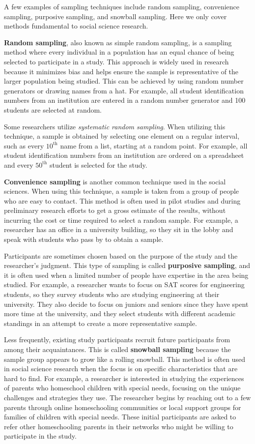 \documentclass[
  letterpaper,
  DIV=11,
  numbers=noendperiod]{scrreprt}
\begin{document}
A few examples of sampling techniques include random sampling,
convenience sampling, purposive sampling, and snowball sampling. Here we
only cover methods fundamental to social science research.

\textbf{Random sampling}, also known as simple random sampling, is a
sampling method where every individual in a population has an equal
chance of being selected to participate in a study. This approach is
widely used in research because it minimizes bias and helps ensure the
sample is representative of the larger population being studied. This
can be achieved by using random number generators or drawing names from
a hat. For example, all student identification numbers from an
institution are entered in a random number generator and 100 students
are selected at random.

Some researchers utilize \emph{systematic random sampling}. When
utilizing this technique, a sample is obtained by selecting one element
on a regular interval, such as every \(10^{\text{th}}\) name from a
list, starting at a random point. For example, all student
identification numbers from an institution are ordered on a spreadsheet
and every \(50^{\text{th}}\) student is selected for the study.

\textbf{Convenience sampling} is another common technique used in the
social sciences. When using this technique, a sample is taken from a
group of people who are easy to contact. This method is often used in
pilot studies and during preliminary research efforts to get a gross
estimate of the results, without incurring the cost or time required to
select a random sample. For example, a researcher has an office in a
university building, so they sit in the lobby and speak with students
who pass by to obtain a sample.

Participants are sometimes chosen based on the purpose of the study and
the researcher's judgment. This type of sampling is called
\textbf{purposive sampling}, and it is often used when a limited number
of people have expertise in the area being studied. For example, a
researcher wants to focus on SAT scores for engineering students, so
they survey students who are studying engineering at their university.
They also decide to focus on juniors and seniors since they have spent
more time at the university, and they select students with different
academic standings in an attempt to create a more representative sample.

Less frequently, existing study participants recruit future participants
from among their acquaintances. This is called \textbf{snowball
sampling} because the sample group appears to grow like a rolling
snowball. This method is often used in social science research when the
focus is on specific characteristics that are hard to find. For example,
a researcher is interested in studying the experiences of parents who
homeschool children with special needs, focusing on the unique
challenges and strategies they use. The researcher begins by reaching
out to a few parents through online homeschooling communities or local
support groups for families of children with special needs. These
initial participants are asked to refer other homeschooling parents in
their networks who might be willing to participate in the study.
\end{document}
